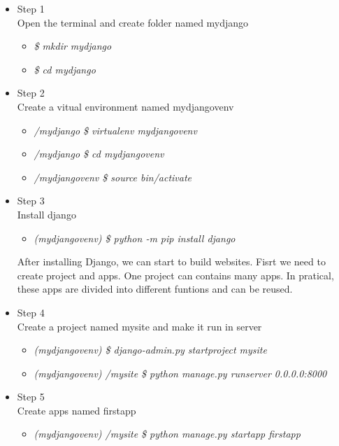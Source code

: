 \begin{itemize}
	  
		\item Step 1\\
		Open the terminal and create folder named mydjango
			\begin{itemize}
				\item\emph {\$ mkdir mydjango}\\
				\item\emph {\$ cd mydjango}
			\end{itemize}	
		\item Step 2\\
		Create a vitual environment named mydjangovenv
			\begin{itemize}
				\item\emph {/mydjango \$ virtualenv mydjangovenv}\\
				\item\emph {/mydjango \$ cd mydjangovenv}\\
				\item\emph {/mydjangovenv \$ source bin/activate}
			\end{itemize}	
		\item Step 3\\
		Install django
			\begin{itemize}
				\item\emph {(mydjangovenv) \$ python -m pip install django}\\
			\end{itemize}	

After installing Django, we can start to build websites. Fisrt we need to create project and apps. One project can contains many apps. In pratical, these apps are divided into different funtions and can be reused. 
		\item Step 4\\
		Create a project named mysite and make it run in server
			\begin{itemize}
				\item\emph {(mydjangovenv) \$ django-admin.py startproject mysite}\\
				\item\emph {(mydjangovenv) /mysite \$ python manage.py runserver 0.0.0.0:8000}
			\end{itemize}	
		\item Step 5\\
		Create apps named firstapp
			\begin{itemize}
				\item\emph {(mydjangovenv) /mysite \$ python manage.py startapp firstapp}\\
			\end{itemize}


\end{itemize}
